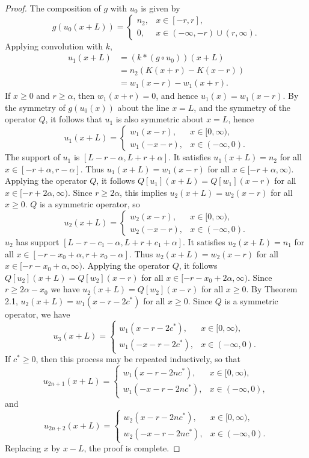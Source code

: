 \documentclass[11pt]{article}
\numberwithin{equation}{section}
\theoremstyle{definition}
\begin{document}
\begin{proof}
The composition of $g$ with $u_0$ is given by
$$
    g(u_0(x+L)) = \begin{cases}
    n_2, & x \in [-r,r], \\
    0, & x \in(-\infty,-r)\cup(r,\infty).
    \end{cases}
$$
Applying convolution with $k$,
$$ \begin{aligned}
u_1(x+L) &= (k*(g\circ u_0))(x+L) \\
&= n_2 \left( K(x+r)-K(x-r) \right) \\
&= w_1(x-r) - w_1(x+r).
\end{aligned} $$
If $x\geq 0$ and $r\geq \alpha$, then $w_1(x+r)=0$, and hence $u_1(x)=w_1(x-r)$. By the symmetry of $g(u_0(x))$ about the line $x=L$, and the symmetry of the operator $Q$, it follows that $u_1$ is also symmetric about $x=L$, hence
$$ u_1(x+L) = \begin{cases}
w_1(x-r), & x \in [0,\infty), \\
w_1(-x-r), & x \in (-\infty,0).
\end{cases} $$
The support of $u_1$ is $[L-r-\alpha,L+r+\alpha]$. It satisfies $u_1(x+L)=n_2$ for all $x\in[-r+\alpha,r-\alpha]$. Thus $u_1(x+L)=w_1(x-r)$ for all $x\in[-r+\alpha,\infty)$. Applying the operator $Q$, it follows $Q[u_1](x+L)=Q[w_1](x-r)$ for all $x\in[-r+2\alpha,\infty)$. Since $r\geq 2\alpha$, this implies $u_2(x+L)=w_2(x-r)$ for all $x\geq 0$. $Q$ is a symmetric operator, so
$$ u_2(x+L) = \begin{cases}
		w_2(x-r), & x\in[0,\infty), \\
		w_2(-x-r), & x\in(-\infty,0).
\end{cases} $$
$u_2$ has support $[L-r-c_1-\alpha,L+r+c_1+\alpha]$. It satisfies $u_2(x+L)=n_1$ for all $x\in[-r-x_0+\alpha,r+x_0-\alpha]$. Thus $u_2(x+L)=w_2(x-r)$ for all $x\in[-r-x_0+\alpha,\infty)$. Applying the operator $Q$, it follows $Q[u_2](x+L)=Q[w_2](x-r)$ for all $x\in[-r-x_0+2\alpha,\infty)$. Since $r\geq 2\alpha-x_0$ we have $u_2(x+L)=Q[w_2](x-r)$ for all $x\geq 0$. By Theorem 2.1, $u_2(x+L)=w_1(x-r-2c^*)$ for all $x\geq 0$. Since $Q$ is a symmetric operator, we have 
$$ u_3(x+L) = \begin{cases}
		w_1(x-r-2c^*), & x\in[0,\infty), \\
		w_1(-x-r-2c^*), & x\in(-\infty,0).
\end{cases} $$
If $c^*\geq0$, then this process may be repeated inductively, so that
$$
u_{2n+1}(x+L) = \begin{cases}
w_1(x-r-2nc^*), & x\in[0,\infty), \\
w_1(-x-r-2nc^*), & x\in(-\infty,0),
\end{cases} $$
and
$$
u_{2n+2}(x+L) = \begin{cases}
w_2(x-r-2nc^*),  & x\in[0,\infty), \\
w_2(-x-r-2nc^*), & x\in(-\infty,0).
\end{cases} $$
Replacing $x$ by $x-L$, the proof is complete.
\end{proof}
\end{document}
